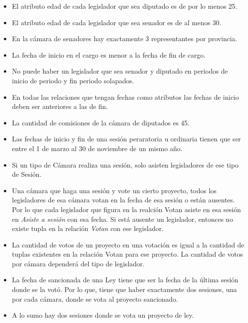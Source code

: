 \begin{itemize}
	\item El atributo edad de cada legislador que sea diputado es de por lo menos 25.
	\item El atributo edad de cada legislador que sea senador es de al menos 30.
	\item En la c\'amara de senadores hay exactamente 3 representantes por provincia.
	\item La fecha de inicio en el cargo es menor a la fecha de fin de cargo.
	\item No puede haber un legislador que sea senador y diputado en periodos de
	 inicio de periodo y fin periodo solapados.
	
	\item En todas las relaciones que tengan fechas como atributos las fechas de inicio
	 deben ser anteriores a las de fin.
	
	\item La cantidad de comisiones de la c\'amara de diputados es 45.
	
	\item Las fechas de inicio y fin de una sesi\'on peraratoria u ordinaria tienen que ser entre el 1 de marzo al 30 de noviembre de un mismo a\~no.
	
	\item Si un tipo de  C\'amara realiza una sesi\'on, solo asisten legisladores de ese tipo de Sesi\'on. 
	
	\item Una c\'amara que haga una sesi\'on y vote un cierto proyecto, todos los legisladores de esa c\'amara votan en la fecha de esa sesi\'on o est\'an ausentes. Por lo que cada legislador que figura en la realci\'on Votan asiste en esa sesi\'on en \textit{Asiste a sesi\'on} con esa fecha. Si est\'a ausente un legislador, entonces no existe tupla en la relaci\'on \textit{Votan} con ese legislador.
	
	\item La cantidad de votos de un proyecto en una votaci\'on es igual a la cantidad de tuplas existentes en la relaci\'on Votan para ese proyecto. La cantidad de votos por c\'amara depender\'a del tipo de legislador.
	
	\item La fecha de sancionada de una Ley tiene que ser la fecha de la \'ultima sesi\'on donde se la vot\'o. Por lo que, tiene que haber exactamente dos sesiones, una por cada c\'amara, donde se vota al proyecto sancionado.
	
	\item A lo sumo hay dos sesiones donde se vota un proyecto de ley.
	

\end{itemize}

